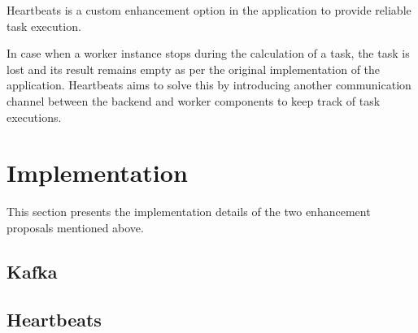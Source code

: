 Heartbeats is a custom enhancement option in the application to provide reliable task execution.

In case when a worker instance stops during the calculation of a task, the task is lost and its result remains empty as per the original implementation of the application. Heartbeats aims to solve this by introducing another communication channel between the backend and worker components to keep track of task executions.

\section{Implementation}

This section presents the implementation details of the two enhancement proposals mentioned above.

\subsection{Kafka}


\subsection{Heartbeats}









